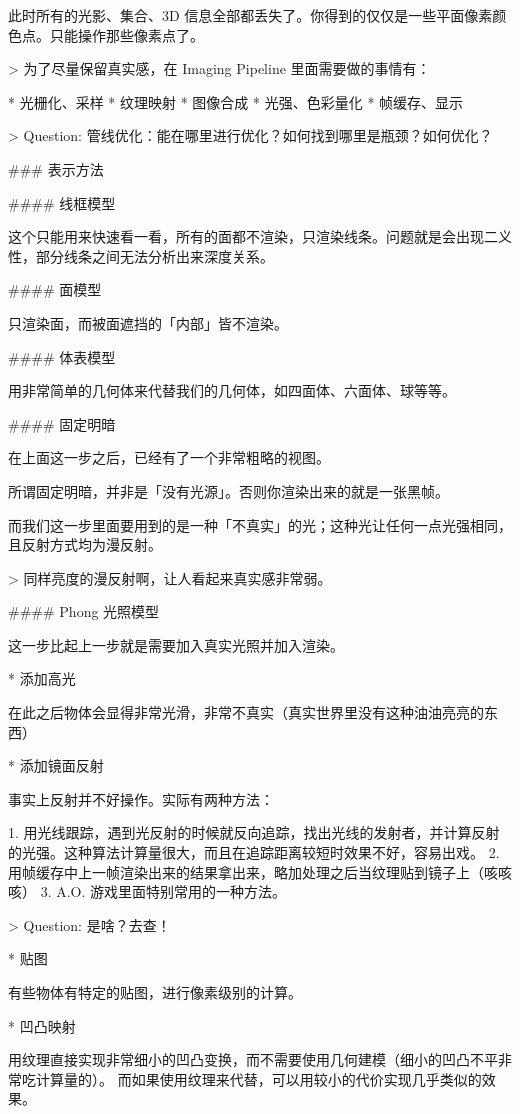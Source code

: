\documentclass[
]{article}
\newenvironment{Shaded}{}{}
\newcommand{\DataTypeTok}[1]{\textcolor[rgb]{0.56,0.13,0.00}{#1}}
\newcommand{\FunctionTok}[1]{\textcolor[rgb]{0.02,0.16,0.49}{#1}}
\newcommand{\NormalTok}[1]{#1}
\newcommand{\StringTok}[1]{\textcolor[rgb]{0.25,0.44,0.63}{#1}}
\begin{document}
\begin{Shaded}
\begin{Highlighting}[]
\NormalTok{此时所有的光影、集合、3D 信息全部都丢失了。你得到的仅仅是一些平面像素颜色点。只能操作那些像素点了。}

\NormalTok{>}\DataTypeTok{ 为了尽量保留真实感，在 Imaging Pipeline 里面需要做的事情有：}

\NormalTok{* }\StringTok{光栅化、采样}
\StringTok{* 纹理映射}
\StringTok{* 图像合成}
\StringTok{* 光强、色彩量化}
\StringTok{* 帧缓存、显示}

\NormalTok{>}\DataTypeTok{ Question: 管线优化：能在哪里进行优化？如何找到哪里是瓶颈？如何优化？}

\FunctionTok{### 表示方法}

\FunctionTok{#### 线框模型}

\NormalTok{这个只能用来快速看一看，所有的面都不渲染，只渲染线条。问题就是会出现二义性，部分线条之间无法分析出来深度关系。}

\FunctionTok{#### 面模型}

\NormalTok{只渲染面，而被面遮挡的「内部」皆不渲染。}

\FunctionTok{#### 体表模型}

\NormalTok{用非常简单的几何体来代替我们的几何体，如四面体、六面体、球等等。}

\FunctionTok{#### 固定明暗}

\NormalTok{在上面这一步之后，已经有了一个非常粗略的视图。}

\NormalTok{所谓固定明暗，并非是「没有光源」。否则你渲染出来的就是一张黑帧。}

\NormalTok{而我们这一步里面要用到的是一种「不真实」的光；这种光让任何一点光强相同，且反射方式均为漫反射。}

\NormalTok{>}\DataTypeTok{ 同样亮度的漫反射啊，让人看起来真实感非常弱。}

\FunctionTok{#### Phong 光照模型}

\NormalTok{这一步比起上一步就是需要加入真实光照并加入渲染。}

\NormalTok{* }\StringTok{添加高光}

\NormalTok{在此之后物体会显得非常光滑，非常不真实（真实世界里没有这种油油亮亮的东西）}

\NormalTok{* }\StringTok{添加镜面反射}

\NormalTok{事实上反射并不好操作。实际有两种方法：}

\NormalTok{1. }\StringTok{用光线跟踪，遇到光反射的时候就反向追踪，找出光线的发射者，并计算反射的光强。这种算法计算量很大，而且在追踪距离较短时效果不好，容易出戏。}
\StringTok{2. 用帧缓存中上一帧渲染出来的结果拿出来，略加处理之后当纹理贴到镜子上（咳咳咳）}
\StringTok{3. A.O. 游戏里面特别常用的一种方法。}

\NormalTok{>}\DataTypeTok{ Question: 是啥？去查！}

\NormalTok{* }\StringTok{贴图}

\NormalTok{有些物体有特定的贴图，进行像素级别的计算。}

\NormalTok{* }\StringTok{凹凸映射}

\NormalTok{用纹理直接实现非常细小的凹凸变换，而不需要使用几何建模（细小的凹凸不平非常吃计算量的）。}
\NormalTok{而如果使用纹理来代替，可以用较小的代价实现几乎类似的效果。}
\end{Highlighting}
\end{Shaded}
\end{document}
